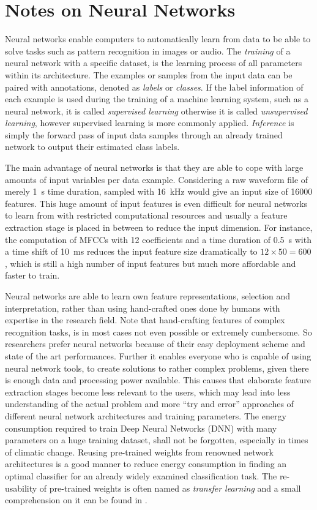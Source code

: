 
\section{Notes on Neural Networks}\label{sec:intro_nn}
Neural networks enable computers to automatically learn from data to be able to solve tasks such as pattern recognition in images or audio.
The \emph{training} of a neural network with a specific dataset, is the learning process of all parameters within its architecture.
The examples or samples from the input data can be paired with annotations, denoted as \emph{labels} or \emph{classes}.
If the label information of each example is used during the training of a machine learning system, such as a neural network, it is called \emph{supervised learning} otherwise it is called \emph{unsupervised learning}, however supervised learning is more commonly applied.
\emph{Inference} is simply the forward pass of input data samples through an already trained network to output their estimated class labels.

The main advantage of neural networks is that they are able to cope with large amounts of input variables per data example.
Considering a raw waveform file of merely \SI{1}{s} time duration, sampled with \SI{16}{\kilo\hertz} would give an input size of 16000 features.
This huge amount of input features is even difficult for neural networks to learn from with restricted computational resources and usually a feature extraction stage is placed in between to reduce the input dimension.
For instance, the computation of MFCCs with 12 coefficients and a time duration of \SI{0.5}{s} with a time shift of \SI{10}{\milli\second} reduces the input feature size dramatically to $12 \times 50 = 600$, which is still a high number of input features but much more affordable and faster to train.

Neural networks are able to learn own feature representations, selection and interpretation, rather than using hand-crafted ones done by humans with expertise in the research field.
Note that hand-crafting features of complex recognition tasks, is in most cases not even possible or extremely cumbersome.
So researchers prefer neural networks because of their easy deployment scheme and state of the art performances.
Further it enables everyone who is capable of using neural network tools, to create solutions to rather complex problems, given there is enough data and processing power available.
This causes that elaborate feature extraction stages become less relevant to the users, which may lead into less understanding of the actual problem and more \enquote{try and error} approaches of different neural network architectures and training parameters.
The energy consumption required to train Deep Neural Networks (DNN) with many parameters on a huge training dataset, shall not be forgotten, especially in times of climatic change.
Reusing pre-trained weights from renowned network architectures is a good manner to reduce energy consumption in finding an optimal classifier for an already widely examined classification task.
The re-usability of pre-trained weights is often named as \emph{transfer learning} and a small comprehension on it can be found in \cite{TransferLearning}.

